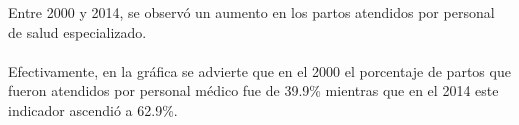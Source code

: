  Entre 2000 y 2014, se observó un aumento en los partos atendidos por personal de salud especializado.\\\\ Efectivamente,  en la gráfica se advierte que   en el 2000  el porcentaje de partos que fueron atendidos por personal médico fue de  39.9\%  mientras que en el 2014 este indicador ascendió a 62.9\%. 